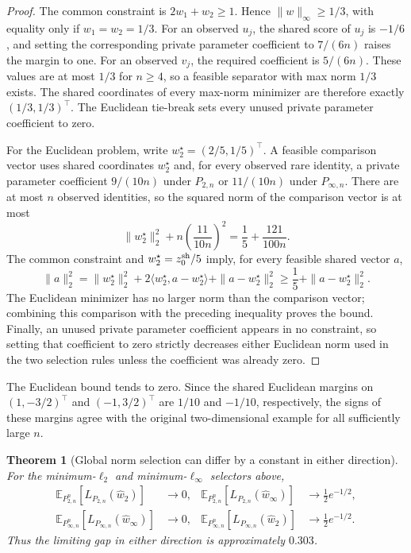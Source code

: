 \documentclass[11pt,twoside]{article}
\newcommand{\E}{\mathbb E}
\newtheorem{theorem}{Theorem}[section]
\theoremstyle{definition}
\theoremstyle{remark}
\begin{document}
\begin{proof}
The common constraint is $2w_1+w_2\ge1$. Hence
$\|w\|_\infty\ge1/3$, with equality only if
$w_1=w_2=1/3$. For an observed $u_j$, the shared score of $u_j$ is
$-1/6$, and setting the corresponding private parameter coefficient to
$7/(6n)$ raises the margin to one. For an observed $v_j$, the required
coefficient is $5/(6n)$. These values are at most $1/3$ for $n\ge4$, so a
feasible separator with max norm $1/3$ exists. The shared coordinates of every
max-norm minimizer are therefore exactly $(1/3,1/3)^\top$. The Euclidean
tie-break sets every unused private parameter coefficient to zero.

For the Euclidean problem, write
$w_2^\star=(2/5,1/5)^\top$. A feasible comparison vector uses shared
coordinates $w_2^\star$ and, for every observed rare identity, a private
parameter coefficient $9/(10n)$ under $P_{2,n}$ or $11/(10n)$ under
$P_{\infty,n}$.
There are at most $n$ observed identities, so the squared norm of the
comparison vector is at most
\[
 \|w_2^\star\|_2^2+n\left(\frac{11}{10n}\right)^2
 =\frac15+\frac{121}{100n}.
\]
The common constraint and $w_2^\star=z_0^{\rm sh}/5$ imply, for every
feasible shared vector $a$,
\[
 \|a\|_2^2
 =\|w_2^\star\|_2^2
  +2\langle w_2^\star,a-w_2^\star\rangle
  +\|a-w_2^\star\|_2^2
 \ge\frac15+\|a-w_2^\star\|_2^2.
\]
The Euclidean minimizer has no larger norm than the comparison vector;
combining this comparison with the preceding inequality proves the
bound. Finally, an unused private parameter coefficient appears in no
constraint, so setting that coefficient to zero strictly decreases either
Euclidean norm used in the two selection rules unless the coefficient was
already zero.
\end{proof}

The Euclidean bound tends to zero. Since the shared Euclidean margins on
$(1,-3/2)^\top$ and $(-1,3/2)^\top$ are $1/10$ and $-1/10$, respectively,
the signs of these margins agree with the original two-dimensional example
for all
sufficiently large $n$.

\begin{theorem}[Global norm selection can differ by a constant in either direction]
\label{thm:private-amplification}
For the minimum-$\ell_2$ and minimum-$\ell_\infty$ selectors above,
\begin{align*}
 \E_{P_{2,n}^n}[L_{P_{2,n}}(\widehat w_2)]&\longrightarrow0,
 &
 \E_{P_{2,n}^n}[L_{P_{2,n}}(\widehat w_\infty)]
 &\longrightarrow\frac12e^{-1/2},\\
 \E_{P_{\infty,n}^n}[L_{P_{\infty,n}}(\widehat w_\infty)]&\longrightarrow0,
 &
 \E_{P_{\infty,n}^n}[L_{P_{\infty,n}}(\widehat w_2)]
 &\longrightarrow\frac12e^{-1/2}.
\end{align*}
Thus the limiting gap in either direction is approximately $0.303$.
\end{theorem}
\end{document}
